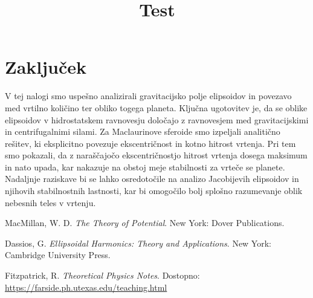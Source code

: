 \documentclass{article}
\theoremstyle{definition}
\theoremstyle{plain}
\numberwithin{definition}{section}
\numberwithin{theorem}{section} \title{Test}
\begin{document}
\newpage


\section{Zaključek}
V tej nalogi smo uspešno analizirali gravitacijsko polje elipsoidov in povezavo med vrtilno količino ter obliko togega planeta. Ključna ugotovitev je, da se oblike elipsoidov v hidrostatskem ravnovesju določajo z ravnovesjem med gravitacijskimi in centrifugalnimi silami. Za Maclaurinove sferoide smo izpeljali analitično rešitev, ki eksplicitno povezuje ekscentričnost in kotno hitrost vrtenja. Pri tem smo pokazali, da z naraščajočo ekscentričnostjo hitrost vrtenja dosega maksimum in nato upada, kar nakazuje na obstoj meje stabilnosti za vrteče se planete. Nadaljnje raziskave bi se lahko osredotočile na analizo Jacobijevih elipsoidov in njihovih stabilnostnih lastnosti, kar bi omogočilo bolj splošno razumevanje oblik nebesnih teles v vrtenju.




\begin{thebibliography}{9}

MacMillan, W. D. \textit{The Theory of Potential}. New York: Dover Publications.

Dassios, G. \textit{Ellipsoidal Harmonics: Theory and Applications}. New York: Cambridge University Press.

Fitzpatrick, R. \textit{Theoretical Physics Notes}. Dostopno: \url{https://farside.ph.utexas.edu/teaching.html}

\end{thebibliography}
\end{document}
